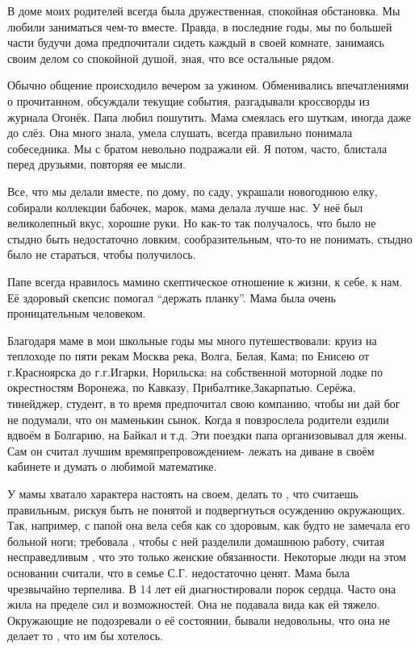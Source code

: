 В доме моих родителей всегда была дружественная, спокойная обстановка. Мы любили заниматься чем-то вместе. Правда, в последние годы, мы по большей части будучи дома предпочитали сидеть каждый в своей комнате, занимаясь своим делом со спокойной душой, зная, что все остальные рядом.

Обычно общение происходило вечером за ужином. Обменивались впечатлениями о прочитанном, обсуждали текущие события, разгадывали кроссворды из журнала Огонёк. Папа любил пошутить. Мама  смеялась его шуткам,  иногда даже до слёз. Она много знала, умела слушать, всегда правильно понимала собеседника. Мы с братом невольно подражали ей. Я потом, часто, блистала перед друзьями, повторяя ее мысли.

Все, что мы делали вместе, по дому, по саду, украшали новогоднюю елку, собирали коллекции бабочек, марок, мама делала лучше нас. У неё был великолепный вкус, хорошие руки. Но как-то так получалось, что было не стыдно быть недостаточно ловким, сообразительным, что-то не понимать, стыдно было не стараться, чтобы получилось.

Папе всегда нравилось мамино скептическое отношение к жизни, к себе, к нам. Её здоровый скепсис помогал “держать планку”. Мама была очень проницательным человеком.

Благодаря маме в мои школьные годы мы много путешествовали: круиз на теплоходе по пяти рекам Москва река, Волга, Белая, Кама; по Енисею от г.Красноярска до г.г.Игарки, Норильска; на собственной моторной лодке по окрестностям Воронежа, по Кавказу, Прибалтике,Закарпатью. Серёжа, тинейджер, студент, в то время предпочитал свою компанию, чтобы ни дай бог не подумали, что он маменькин сынок. Когда я повзрослела родители ездили вдвоём в Болгарию, на Байкал и т.д. Эти поездки папа организовывал для жены. Сам он считал лучшим времяпрепровождением- лежать на диване в своём кабинете и думать о любимой математике.

У мамы хватало характера настоять на своем, делать то , что считаешь правильным, рискуя быть не понятой и подвергнуться осуждению окружающих. Так, например, с папой она вела себя как со здоровым, как будто не замечала его больной ноги; требовала , чтобы с ней разделили домашнюю работу, считая несправедливым , что это только женские обязанности. Некоторые люди на этом основании считали, что в семье С.Г. недостаточно ценят.
Мама была чрезвычайно терпелива. В 14 лет ей диагностировали порок сердца. Часто она жила на пределе сил и возможностей. Она не подавала вида как ей тяжело. Окружающие не подозревали о её состоянии, бывали недовольны, что она не делает то , что им бы хотелось.

